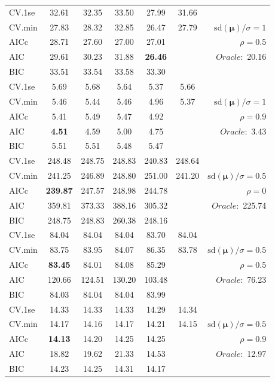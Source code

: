 \begin{table}
\begin{center}
\begin{tabular}{l*{5}{c}|r}
 \hline 
CV.1se & 32.61 & 32.35 & 33.50 & 27.99 & 31.66 & \\
CV.min & 27.83 & 28.32 & 32.85 & 26.47 & 27.79 &  $\mathrm{sd}(\mathbf{\mu})/\sigma=1$ \\
AICc & 28.71 & 27.60 & 27.00 & 27.01 & & $\rho=0.5$ \\
AIC & 29.61 & 30.23 & 31.88 & {\bf 26.46} & &  \multirow{2}{*}{$Oracle: $ 20.16} \\
BIC & 33.51 & 33.54 & 33.58 & 33.30 & &  \\
 \hline 
CV.1se & 5.69 & 5.68 & 5.64 & 5.37 & 5.66 & \\
CV.min & 5.46 & 5.44 & 5.46 & 4.96 & 5.37 &  $\mathrm{sd}(\mathbf{\mu})/\sigma=1$ \\
AICc & 5.41 & 5.49 & 5.47 & 4.92 & & $\rho=0.9$ \\
AIC & {\bf 4.51} & 4.59 & 5.00 & 4.75 & &  \multirow{2}{*}{$Oracle: $ 3.43} \\
BIC & 5.51 & 5.51 & 5.48 & 5.47 & &  \\
 \hline 
CV.1se & 248.48 & 248.75 & 248.83 & 240.83 & 248.64 & \\
CV.min & 241.25 & 246.89 & 248.80 & 251.00 & 241.20 &  $\mathrm{sd}(\mathbf{\mu})/\sigma=0.5$ \\
AICc & {\bf 239.87} & 247.57 & 248.98 & 244.78 & & $\rho=0$ \\
AIC & 359.81 & 373.33 & 388.16 & 305.32 & &  \multirow{2}{*}{$Oracle: $ 225.74} \\
BIC & 248.75 & 248.83 & 260.38 & 248.16 & &  \\
 \hline 
CV.1se & 84.04 & 84.04 & 84.04 & 83.70 & 84.04 & \\
CV.min & 83.75 & 83.95 & 84.07 & 86.35 & 83.78 &  $\mathrm{sd}(\mathbf{\mu})/\sigma=0.5$ \\
AICc & {\bf 83.45} & 84.01 & 84.08 & 85.29 & & $\rho=0.5$ \\
AIC & 120.66 & 124.51 & 130.20 & 103.48 & &  \multirow{2}{*}{$Oracle: $ 76.23} \\
BIC & 84.03 & 84.04 & 84.04 & 83.99 & &  \\
 \hline 
CV.1se & 14.33 & 14.33 & 14.33 & 14.29 & 14.34 & \\
CV.min & 14.17 & 14.16 & 14.17 & 14.21 & 14.15 &  $\mathrm{sd}(\mathbf{\mu})/\sigma=0.5$ \\
AICc & {\bf 14.13} & 14.20 & 14.25 & 14.25 & & $\rho=0.9$ \\
AIC & 18.82 & 19.62 & 21.33 & 14.53 & &  \multirow{2}{*}{$Oracle: $ 12.97} \\
BIC & 14.23 & 14.25 & 14.31 & 14.17 & &  \\
 \hline 
\end{tabular}
\end{center}
\vspace{-1cm}
\end{table}




